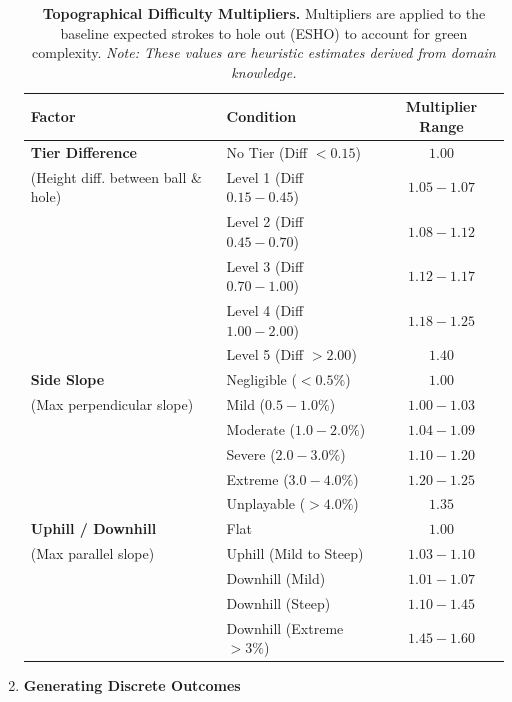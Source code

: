 \documentclass[11pt, letterpaper]{article}
\begin{document}
\begin{enumerate}
\begin{table}[h!]
    \centering
    \scriptsize
    \caption{\textbf{Topographical Difficulty Multipliers.} Multipliers are applied to the baseline expected strokes to hole out (ESHO) to account for green complexity. \textit{Note: These values are heuristic estimates derived from domain knowledge.}}
    \label{tab:multipliers}
    \renewcommand{\arraystretch}{1.2}
    \begin{tabular}{llc}
        \toprule
        \textbf{Factor} & \textbf{Condition} & \textbf{Multiplier Range} \\
        \midrule
        \textbf{Tier Difference} & No Tier (Diff $< 0.15$) & $1.00$ \\
        (Height diff. between ball \& hole) & Level 1 (Diff $0.15 - 0.45$) & $1.05 - 1.07$ \\
        & Level 2 (Diff $0.45 - 0.70$) & $1.08 - 1.12$ \\
        & Level 3 (Diff $0.70 - 1.00$) & $1.12 - 1.17$ \\
        & Level 4 (Diff $1.00 - 2.00$) & $1.18 - 1.25$ \\
        & Level 5 (Diff $> 2.00$) & $1.40$ \\
        \midrule
        \textbf{Side Slope} & Negligible ($< 0.5\%$) & $1.00$ \\
        (Max perpendicular slope) & Mild ($0.5 - 1.0\%$) & $1.00 - 1.03$ \\
        & Moderate ($1.0 - 2.0\%$) & $1.04 - 1.09$ \\
        & Severe ($2.0 - 3.0\%$) & $1.10 - 1.20$ \\
        & Extreme ($3.0 - 4.0\%$) & $1.20 - 1.25$ \\
        & Unplayable ($> 4.0\%$) & $1.35$ \\
        \midrule
        \textbf{Uphill / Downhill} & Flat & $1.00$ \\
        (Max parallel slope) & Uphill (Mild to Steep) & $1.03 - 1.10$ \\
        & Downhill (Mild) & $1.01 - 1.07$ \\
        & Downhill (Steep) & $1.10 - 1.45$ \\
        & Downhill (Extreme $>3\%$) & $1.45 - 1.60$ \\
        \bottomrule
    \end{tabular}
\end{table}


\item\textbf{Generating Discrete Outcomes}


\end{enumerate}
\end{document}
